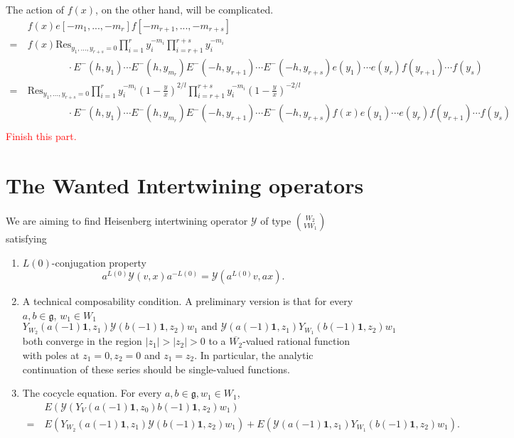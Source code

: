 \documentclass{article}
\theoremstyle{definition}
\newcommand{\Y}{{\mathcal Y}}
\newcommand{\one}{\mathbf{1}}
\newcommand{\Res}{\text{Res}}
\begin{document}
The action of $f(x)$, on the other hand, will be complicated. 
\begin{align*}
    & f(x)e[-m_1, ..., -m_r]f[-m_{r+1}, ..., -m_{r+s}] \\
    = \ & f(x) \Res_{y_1, ...,  y_{r+s} = 0} \prod_{i=1}^r y_i^{-m_i} \prod_{i=r+1}^{r+s} y_i^{-m_i} \\
    & \qquad \qquad \cdot E^-(h, y_1) \cdots E^-(h, y_{m_r}) E^-(-h, y_{r+1}) \cdots E^-(-h, y_{r+s})e(y_1) \cdots e(y_r) f(y_{r+1}) \cdots f(y_s)\\
    = \ & \Res_{y_1, ...,  y_{r+s} = 0} \prod_{i=1}^{r}y_i^{-m_i} \left(1-\frac y x\right)^{2/l} \prod_{i=r+1}^{r+s}y_i^{-m_i} \left(1-\frac y x\right)^{-2/l} \\
    & \qquad \qquad \cdot E^-(h, y_1) \cdots E^-(h, y_{m_r}) E^-(-h, y_{r+1}) \cdots E^-(-h, y_{r+s})f(x)e(y_1) \cdots e(y_r) f(y_{r+1}) \cdots f(y_s)\\
\end{align*}
\textcolor{red}{Finish this part. }

\section{The Wanted Intertwining operators}

We are aiming to find Heisenberg intertwining operator $\Y$ of type $\binom{W_2}{VW_1}$ satisfying 

\begin{enumerate}
    \item $L(0)$-conjugation property
$$a^{L(0)}\Y(v,x)a^{-L(0)} = \Y(a^{L(0)}v, ax).$$
    \item A technical composability condition. A preliminary version is that for every $a,b\in \mathfrak{g}$, $w_1\in W_1$
    $$Y_{W_2}(a(-1)\one, z_1) \Y(b(-1)\one, z_2) w_1 \text{ and } \Y(a(-1)\one, z_1) Y_{W_1}(b(-1)\one, z_2) w_1 $$
    both converge in the region $|z_1|>|z_2|>0$ to a $\overline{W_2}$-valued rational function with poles at $z_1=0, z_2=0$ and $z_1=z_2$. In particular, the analytic continuation of these series should be single-valued functions. 
    \item The cocycle equation. For every $a, b\in \mathfrak{g}, w_1\in W_1$, 
    \begin{align*}
        & E(\Y(Y_V(a(-1)\one, z_0)b(-1)\one, z_2)w_1) \\
        = \ & E(Y_{W_2}(a(-1)\one, z_1) \Y(b(-1)\one, z_2) w_1) + E(\Y(a(-1)\one, z_1) Y_{W_1}(b(-1)\one, z_2) w_1).
    \end{align*}
\end{enumerate}
\end{document}
